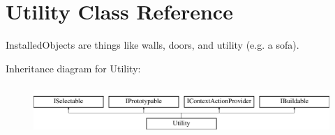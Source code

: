 \hypertarget{class_utility}{}\section{Utility Class Reference}
\label{class_utility}


Installed\+Objects are things like walls, doors, and utility (e.\+g. a sofa).  


Inheritance diagram for Utility\+:\begin{figure}[H]
\begin{center}
\leavevmode
\includegraphics[height=1.866667cm]{class_utility}
\end{center}
\end{figure}
